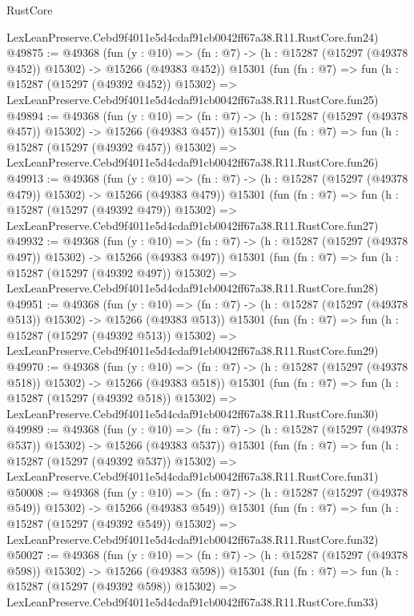 \begin{lexlean}{RustCore}
\begin{coremodule}
    LexLeanPreserve.Cebd9f4011e5d4cdaf91cb0042ff67a38.R11.RustCore.fun24)
@49875 := @49368
    (fun (y : @10) =>
    (fn : @7) -> (h : @15287 (@15297 (@49378 @452)) @15302) -> @15266 (@49383 @452))
    @15301
    (fun (fn : @7) =>
    fun (h : @15287 (@15297 (@49392 @452)) @15302) =>
    LexLeanPreserve.Cebd9f4011e5d4cdaf91cb0042ff67a38.R11.RustCore.fun25)
@49894 := @49368
    (fun (y : @10) =>
    (fn : @7) -> (h : @15287 (@15297 (@49378 @457)) @15302) -> @15266 (@49383 @457))
    @15301
    (fun (fn : @7) =>
    fun (h : @15287 (@15297 (@49392 @457)) @15302) =>
    LexLeanPreserve.Cebd9f4011e5d4cdaf91cb0042ff67a38.R11.RustCore.fun26)
@49913 := @49368
    (fun (y : @10) =>
    (fn : @7) -> (h : @15287 (@15297 (@49378 @479)) @15302) -> @15266 (@49383 @479))
    @15301
    (fun (fn : @7) =>
    fun (h : @15287 (@15297 (@49392 @479)) @15302) =>
    LexLeanPreserve.Cebd9f4011e5d4cdaf91cb0042ff67a38.R11.RustCore.fun27)
@49932 := @49368
    (fun (y : @10) =>
    (fn : @7) -> (h : @15287 (@15297 (@49378 @497)) @15302) -> @15266 (@49383 @497))
    @15301
    (fun (fn : @7) =>
    fun (h : @15287 (@15297 (@49392 @497)) @15302) =>
    LexLeanPreserve.Cebd9f4011e5d4cdaf91cb0042ff67a38.R11.RustCore.fun28)
@49951 := @49368
    (fun (y : @10) =>
    (fn : @7) -> (h : @15287 (@15297 (@49378 @513)) @15302) -> @15266 (@49383 @513))
    @15301
    (fun (fn : @7) =>
    fun (h : @15287 (@15297 (@49392 @513)) @15302) =>
    LexLeanPreserve.Cebd9f4011e5d4cdaf91cb0042ff67a38.R11.RustCore.fun29)
@49970 := @49368
    (fun (y : @10) =>
    (fn : @7) -> (h : @15287 (@15297 (@49378 @518)) @15302) -> @15266 (@49383 @518))
    @15301
    (fun (fn : @7) =>
    fun (h : @15287 (@15297 (@49392 @518)) @15302) =>
    LexLeanPreserve.Cebd9f4011e5d4cdaf91cb0042ff67a38.R11.RustCore.fun30)
@49989 := @49368
    (fun (y : @10) =>
    (fn : @7) -> (h : @15287 (@15297 (@49378 @537)) @15302) -> @15266 (@49383 @537))
    @15301
    (fun (fn : @7) =>
    fun (h : @15287 (@15297 (@49392 @537)) @15302) =>
    LexLeanPreserve.Cebd9f4011e5d4cdaf91cb0042ff67a38.R11.RustCore.fun31)
@50008 := @49368
    (fun (y : @10) =>
    (fn : @7) -> (h : @15287 (@15297 (@49378 @549)) @15302) -> @15266 (@49383 @549))
    @15301
    (fun (fn : @7) =>
    fun (h : @15287 (@15297 (@49392 @549)) @15302) =>
    LexLeanPreserve.Cebd9f4011e5d4cdaf91cb0042ff67a38.R11.RustCore.fun32)
@50027 := @49368
    (fun (y : @10) =>
    (fn : @7) -> (h : @15287 (@15297 (@49378 @598)) @15302) -> @15266 (@49383 @598))
    @15301
    (fun (fn : @7) =>
    fun (h : @15287 (@15297 (@49392 @598)) @15302) =>
    LexLeanPreserve.Cebd9f4011e5d4cdaf91cb0042ff67a38.R11.RustCore.fun33)

\end{coremodule}
\end{lexlean}
